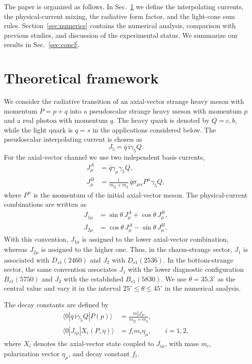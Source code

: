 \documentclass[aps,prd,preprint,nofootinbib,superscriptaddress]{revtex4-2}
\newcommand{\ii}{\mathrm{i}}
\newcommand{\Dsone}{D_{s1}}
\newcommand{\Bsone}{B_{s1}}
\begin{document}
The paper is organized as follows. In Sec.~\ref{sec:framework} we define the
interpolating currents, the physical-current mixing, the radiative form factor,
and the light-cone sum rules. Section~\ref{sec:numerics} contains the numerical
analysis, comparison with previous studies, and discussion of the experimental
status. We summarize our results in Sec.~\ref{sec:concl}.

\section{Theoretical framework}
\label{sec:framework}

We consider the radiative transition of an axial-vector strange heavy meson
with momentum \(P=p+q\) into a pseudoscalar strange heavy meson with momentum
\(p\) and a real photon with momentum \(q\).  The heavy quark is denoted by
\(Q=c,b\), while the light quark is \(q=s\) in the applications considered
below.  The pseudoscalar interpolating current is chosen as
\begin{equation}
  J_5=\bar q\,\ii\gamma_5 Q .
  \label{eq:j5}
\end{equation}
For the axial-vector channel we use two independent basis currents,
\begin{align}
  J^A_\mu &= \bar q\gamma_\mu\gamma_5 Q, \\
  J^B_\mu &= \frac{\ii}{m_Q+m_q}\,
  \bar q\sigma_{\mu\alpha}P^\alpha\gamma_5 Q ,
  \label{eq:basis-currents}
\end{align}
where \(P^\alpha\) is the momentum of the initial axial-vector meson.  The
physical-current combinations are written as
\begin{align}
  J_{1\mu} &= \sin\theta\,J^A_\mu+\cos\theta\,J^B_\mu,\\
  J_{2\mu} &= \cos\theta\,J^A_\mu-\sin\theta\,J^B_\mu .
  \label{eq:physical-currents}
\end{align}
With this convention, \(J_{1\mu}\) is assigned to the lower axial-vector
combination, whereas \(J_{2\mu}\) is assigned to the higher one.  Thus, in the
charm-strange sector, \(J_1\) is associated with \(\Dsone(2460)\) and \(J_2\)
with \(\Dsone(2536)\).  In the bottom-strange sector, the same convention
associates \(J_1\) with the lower diagnostic configuration \(\Bsone(5750)\)
and \(J_2\) with the established \(\Bsone(5830)\).  We use
\(\theta=35.3^\circ\) as the central value and vary it in the interval
\(25^\circ\leq\theta\leq45^\circ\) in the numerical analysis.

The decay constants are defined by
\begin{align}
  \langle 0|\bar q\,\ii\gamma_5 Q|P(p)\rangle
  &=
  \frac{m_P^2 f_P}{m_Q+m_q},
  \label{eq:fp-def}\\
  \langle0|J_{i\mu}|X_i(P,\eta)\rangle
  &=f_i m_i\eta_\mu ,
  \qquad i=1,2 ,
  \label{eq:fi-def}
\end{align}
where \(X_i\) denotes the axial-vector state coupled to \(J_{i\mu}\), with
mass \(m_i\), polarization vector \(\eta_\mu\), and decay constant \(f_i\).
\end{document}
